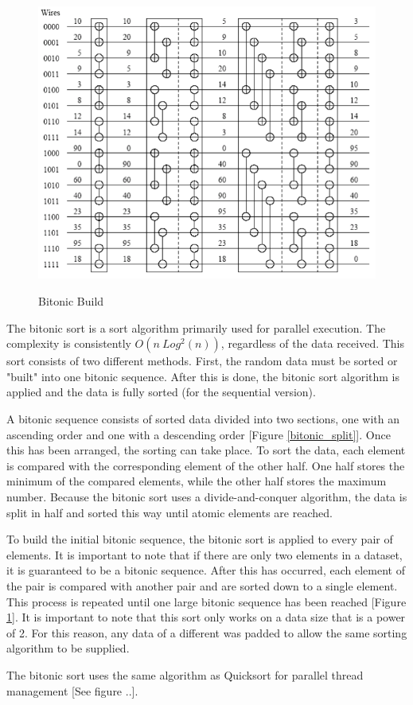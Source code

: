 \documentclass[journal]{IEEEtran}
\begin{document}
	\begin{figure}[t!]
	\caption{Bitonic Build}
  \centering
	\includegraphics[width=.5\textwidth]{bitonic_build_2.png}
	\label{bitonic_build}
	\end{figure}

The bitonic sort is a sort algorithm primarily used for parallel execution. The complexity is consistently  $O(n\ Log^2(n))$, regardless of the data received. This sort consists of two different methods.  First, the random data must be sorted or "built" into one bitonic sequence.  After this is done, the bitonic sort algorithm is applied and the data is fully sorted (for the sequential version).  

A bitonic sequence consists of sorted data divided into two sections, one with an ascending order and one with a descending order [Figure \ref{bitonic_split}].   Once this has been arranged, the sorting can take place.  To sort the data, each element is compared with the corresponding element of the other half. One half stores the minimum of the compared elements, while the other half stores the maximum number.  Because the bitonic sort uses a divide-and-conquer algorithm, the data is split in half and sorted this way until atomic elements are reached.  

To build the initial bitonic sequence, the bitonic sort is applied to every pair of elements.  It is important to note that if there are only two elements in a dataset, it is guaranteed to be a bitonic sequence.  After this has occurred, each element of the pair is compared with another pair and are sorted down to a single element.  This process is repeated until one large bitonic sequence has been reached [Figure \ref{bitonic_build}].  It is important to note that this sort only works on a data size that is a power of 2.  For this reason, any data of a different was padded to allow the same sorting algorithm to be supplied.

The bitonic sort uses the same algorithm as Quicksort for parallel thread management [See figure ..].
\end{document}
